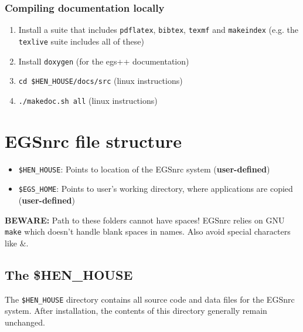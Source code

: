 \documentclass[12pt,twoside]{article}
\begin{document}
\subsubsection{Compiling documentation locally}
\begin{enumerate}
\item Install a \latex suite that includes \Verb+pdflatex+, \Verb+bibtex+, \Verb+texmf+ and \Verb+makeindex+ (e.g. the \Verb+texlive+ suite includes all of these)
\item Install \Verb+doxygen+ (for the egs++ documentation)
\item \Verb+cd $HEN_HOUSE/docs/src+ (linux instructions)
\item \Verb+./makedoc.sh all+ (linux instructions)
\end{enumerate}

\clearpage
\section{EGSnrc file structure}
\begin{itemize}
\item \Verb+$HEN_HOUSE+: Points to location of the EGSnrc system (\textbf{user-defined})

\item \Verb+$EGS_HOME+: Points to user's working directory, where applications are copied (\textbf{user-defined})
\end{itemize}

\textbf{BEWARE:} Path to these folders cannot have spaces! EGSnrc relies on GNU \Verb+make+ which doesn't handle blank spaces in names. Also avoid special characters like $\&$.

\subsection{The \$HEN\_HOUSE}
The \Verb+$HEN_HOUSE+ directory contains all source code and data files for the
EGSnrc system. After installation, the contents of this directory generally remain unchanged.
\end{document}
